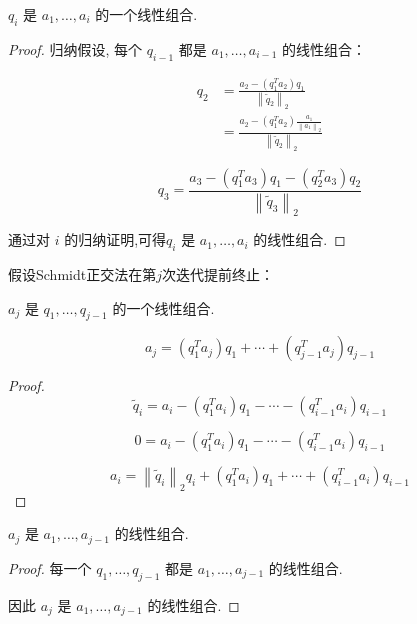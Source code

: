 \begin{corollary}
    $ q_{i} $ 是 $ a_{1}, \ldots, a_{i} $ 的一个线性组合.
\end{corollary}

\begin{proof}
    归纳假设, 每个 $ q_{i-1} $ 都是 $ a_{1}, \ldots, a_{i-1} $ 的线性组合：

    $$ \begin{aligned}q_{2}&= \frac{a_{2}-\left(q_{1}^{T} a_{2}\right) q_{1}}{\left\|\tilde{q}_{2}\right\|_{2}}
        \\ &=
        \frac{a_{2}-\left(q_{1}^{T} a_{2}\right) \frac{ a_{1} }{\left\|a_{1}\right\|_{2}} }{\left\|\tilde{q}_{2}\right\|_{2}}
    \end{aligned} $$

$$ q_{3}=
\frac{a_{3}-\left(q_{1}^{T} a_{3}\right) q_{1}-\left(q_{2}^{T} a_{3}\right) q_{2}}{\left\|\tilde{q}_{3}\right\|_2 }  $$

通过对 $ i $ 的归纳证明,可得$ q_{i} $ 是 $ a_{1}, \ldots, a_{i} $ 的线性组合.
\end{proof}


假设Schmidt正交法在第$j$次迭代提前终止：

\begin{corollary}
    $ a_{j} $ 是 $ q_{1}, \ldots, q_{j-1} $ 的一个线性组合.

$$ a_{j}=\left(q_{1}^{T} a_{j}\right) q_{1}+\cdots+\left(q_{j-1}^{T} a_{j}\right) q_{j-1} $$
\end{corollary}


\begin{proof}
    $$ \widetilde{q}_{i}=a_{i}-\left(q_{1}^{T} a_{i}\right) q_{1}-\cdots-\left(q_{i-1}^{T} a_{i}\right) q_{i-1} $$

    $$ 0=a_{i}-\left(q_{1}^{T} a_{i}\right) q_{1}-\cdots-\left(q_{i-1}^{T} a_{i}\right) q_{i-1} $$

    $$ a_{i}=\left\|\tilde{q}_{i}\right\|_{2} q_{i}+\left(q_{1}^{T} a_{i}\right) q_{1}+\cdots+\left(q_{i-1}^{T} a_{i}\right) q_{i-1} $$
\end{proof}

\begin{corollary}
    $ a_{j} $ 是 $ a_{1}, \ldots, a_{j-1} $ 的线性组合.
\end{corollary}

\begin{proof}
    每一个 $ q_{1}, \ldots, q_{j-1} $ 都是 $ a_{1}, \ldots, a_{j-1} $ 的线性组合.

    因此 $ a_{j} $ 是 $ a_{1}, \ldots, a_{j-1} $ 的线性组合.
\end{proof}
